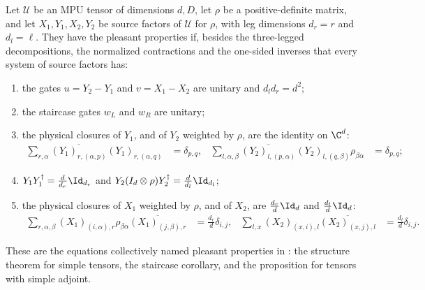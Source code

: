 \begin{definition}
    \label{def:mpug_pleasant_properties}
    \leanok
    Let $\mathcal U$ be an MPU tensor of dimensions $d,D$, let $\rho$ be a
    positive-definite matrix, and let $X_1,Y_1,X_2,Y_2$ be source factors of
    $\mathcal U$ for $\rho$, with leg dimensions $d_r=r$ and $d_l=\ell$. They
    have the pleasant properties if, besides the three-legged decompositions,
    the normalized contractions and the one-sided inverses that every system
    of source factors has:
    \begin{enumerate}
        \item the gates $u=Y_2\mathbin{-}Y_1$ and $v=X_1\mathbin{-}X_2$ are
              unitary and $d_ld_r=d^2$;
        \item the staircase gates $w_L$ and $w_R$ are unitary;
        \item the physical closures of $Y_1$, and of $Y_2$ weighted by $\rho$,
              are the identity on $\C^d$:
              \begin{align}
                  \sum_{r,\alpha}\overline{(Y_1)_{r,(\alpha,p)}}(Y_1)_{r,(\alpha,q)}
                   & =\delta_{p,q}, &
                  \sum_{l,\alpha,\beta}\overline{(Y_2)_{l,(p,\alpha)}}(Y_2)_{l,(q,\beta)}
                  \rho_{\beta\alpha}
                   & =\delta_{p,q};
              \end{align}
        \item $Y_1Y_1^\dagger=\frac{d}{d_r}\Id_{d_r}$ and
              $Y_2(I_d\otimes\rho)Y_2^\dagger=\frac{d}{d_l}\Id_{d_l}$;
        \item the physical closures of $X_1$ weighted by $\rho$, and of $X_2$,
              are $\frac{d_r}{d}\Id_d$ and $\frac{d_l}{d}\Id_d$:
              \begin{align}
                  \sum_{r,\alpha,\beta}(X_1)_{(i,\alpha),r}\rho_{\beta\alpha}
                  \overline{(X_1)_{(j,\beta),r}}
                   & =\frac{d_r}{d}\delta_{i,j}, &
                  \sum_{l,x}(X_2)_{(x,i),l}\overline{(X_2)_{(x,j),l}}
                   & =\frac{d_l}{d}\delta_{i,j}.
              \end{align}
    \end{enumerate}
    These are the equations collectively named pleasant properties in
    \cite[lines~5342--5350]{FrancoRubio2025MPUGauging}: the structure theorem
    for simple tensors, the staircase corollary, and the proposition for
    tensors with simple adjoint.
\end{definition}

